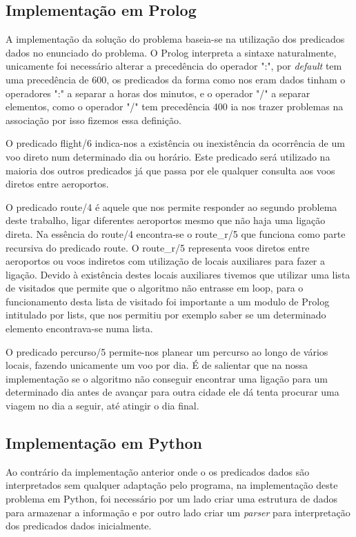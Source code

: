 \documentclass[12pt,a4paper]{article}
\begin{document}
\subsection{Implementação em Prolog}
A implementação da solução do problema baseia-se na utilização dos predicados dados no enunciado do problema. O Prolog interpreta a sintaxe naturalmente, unicamente foi necessário alterar a precedência do operador ":", por \textit{default} tem uma precedência de 600, os predicados da forma como nos eram dados tinham o operadores ":" a separar a horas dos minutos, e o operador "/" a separar elementos, como o operador "/" tem precedência 400 ia nos trazer problemas na associação por isso fizemos essa definição.

O predicado flight/6 indica-nos a existência ou inexistência da ocorrência de um voo direto num determinado dia ou horário. Este predicado será utilizado na maioria dos outros predicados já que passa por ele qualquer consulta aos voos diretos entre aeroportos.

O predicado route/4 é aquele que nos permite responder ao segundo problema deste trabalho, ligar diferentes aeroportos mesmo que não haja uma ligação direta. Na essência do route/4 encontra-se o route\_r/5 que funciona como parte recursiva do predicado route. O route\_r/5 representa voos diretos entre aeroportos ou voos indiretos com utilização de locais auxiliares para fazer a ligação. Devido à existência destes locais auxiliares tivemos que utilizar uma lista de visitados que permite que o algoritmo não entrasse em loop, para o funcionamento desta lista de visitado foi importante a um modulo de Prolog intitulado por lists, que nos permitiu por exemplo saber se um determinado elemento encontrava-se numa lista.

O predicado percurso/5 permite-nos planear um percurso ao longo de vários locais, fazendo unicamente um voo por dia. É de salientar que na nossa implementação se o algoritmo não conseguir encontrar uma ligação para um determinado dia antes de avançar para outra cidade ele dá tenta procurar uma viagem no dia a seguir, até atingir o dia final.
\subsection{Implementação em Python}
Ao contrário da implementação anterior onde o os predicados dados são interpretados sem qualquer adaptação pelo programa, na implementação deste problema em Python, foi necessário por um lado criar uma estrutura de dados para armazenar a informação e por outro lado criar um \textit{parser} para interpretação dos predicados dados inicialmente.
\end{document}
